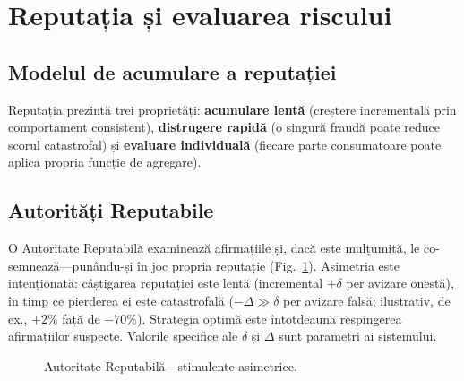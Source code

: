 \documentclass[11pt,a4paper,twocolumn]{article}
\begin{document}
\section{Reputația și evaluarea riscului}

\subsection{Modelul de acumulare a reputației}

Reputația prezintă trei proprietăți: \textbf{acumulare lentă} (creștere incrementală prin comportament consistent), \textbf{distrugere rapidă} (o singură fraudă poate reduce scorul catastrofal) și \textbf{evaluare individuală} (fiecare parte consumatoare poate aplica propria funcție de agregare).

\subsection{Autorități Reputabile}

O Autoritate Reputabilă examinează afirmațiile și, dacă este mulțumită, le co-semnează---punându-și în joc propria reputație (Fig.~\ref{fig:authority}). Asimetria este intenționată: câștigarea reputației este lentă (incremental $+\delta$ per avizare onestă), în timp ce pierderea ei este catastrofală ($-\Delta \gg \delta$ per avizare falsă; ilustrativ, de ex., $+2\%$ față de $-70\%$). Strategia optimă este întotdeauna respingerea afirmațiilor suspecte. Valorile specifice ale $\delta$ și $\Delta$ sunt parametri ai sistemului.

\begin{figure}[ht]
\centering
{}
\caption{Autoritate Reputabilă---stimulente asimetrice.}
\label{fig:authority}
\end{figure}
\end{document}
